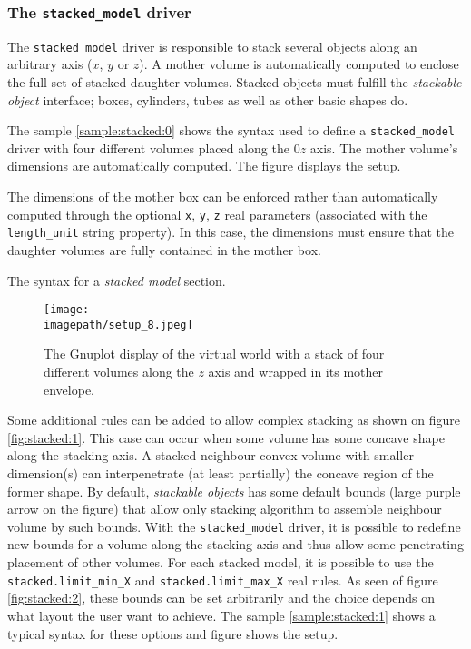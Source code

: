 \subsubsection{The \texttt{stacked\_model} driver}

The \texttt{stacked\_model} driver is responsible to stack several objects
along an arbitrary axis ($x$, $y$ or $z$). A mother volume is automatically 
computed to enclose the full set of stacked daughter volumes. Stacked objects
must fulfill the \emph{stackable object} interface; boxes, cylinders, 
tubes as well as other basic shapes do. 

The sample  \ref{sample:stacked:0} shows the  syntax used to  define a
\texttt{stacked\_model}  driver  with  four different  volumes  placed
along the $0z$ axis.  The mother volume's dimensions are automatically
computed.  The figure \label{fig:setup_8:0} displays the setup.

The  dimensions  of  the  mother  box  can  be  enforced  rather  than
automatically  computed through  the optional  \texttt{x}, \texttt{y},
\texttt{z} real parameters  (associated with the \texttt{length\_unit}
string property).  In this case,  the dimensions must ensure  that the
daughter volumes are fully contained in the mother box.

\begin{sample}[h]
\caption{The syntax for a \emph{stacked model} section.}
\label{sample:stacked:0}
\end{sample}

\begin{figure}[h]
\begin{center}
\texttt{[image: \\imagepath/setup\_8.jpeg]}
\end{center}
\caption{The Gnuplot display of the virtual world with a stack of four
  different  volumes along  the $z$  axis  and wrapped  in its  mother
  envelope.}
\label{fig:setup_8:0}
\end{figure}


Some additional rules can be  added to allow complex stacking as shown
on figure  \ref{fig:stacked:1}. This case  can occur when  some volume
has some  concave shape along  the stacking axis. A  stacked neighbour
convex volume  with smaller dimension(s) can  interpenetrate (at least
partially)  the  concave region  of  the  former  shape.  By  default,
\emph{stackable objects}  has some default bounds  (large purple arrow
on  the  figure)  that  allow  only  stacking  algorithm  to  assemble
neighbour  volume by  such bounds.   With  the \texttt{stacked\_model}
driver, it is  possible to redefine new bounds for  a volume along the
stacking  axis and  thus  allow some  penetrating  placement of  other
volumes.   For  each  stacked  model,   it  is  possible  to  use  the
\texttt{stacked.limit\_min\_X} and \texttt{stacked.limit\_max\_X} real
rules. As seen of figure  \ref{fig:stacked:2}, these bounds can be set
arbitrarily and  the choice  depends on what  layout the user  want to
achieve. The sample \ref{sample:stacked:1}  shows a typical syntax for
these options and figure  \label{fig:setup_9:0} shows the setup.

